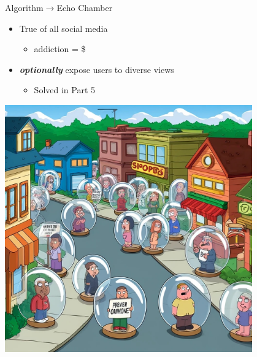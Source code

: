 \documentclass[aspectratio=35]{beamer} %
\begin{document}
\begin{frame}{Algorithm$\rightarrow$Echo Chamber}
\vspace{-0.6in}
\begin{itemize}
    \item True of all social media
    \begin{itemize}
        \item addiction = \$
    \end{itemize}
    \item \textit{\textbf{optionally}} expose users to diverse views
    \begin{itemize}
        \item Solved in Part 5
    \end{itemize}
\end{itemize}
\center
\includegraphics[width=0.8\textwidth]{imgs/why_replace/bubble_town.jpeg}
\end{frame}
\end{document}
